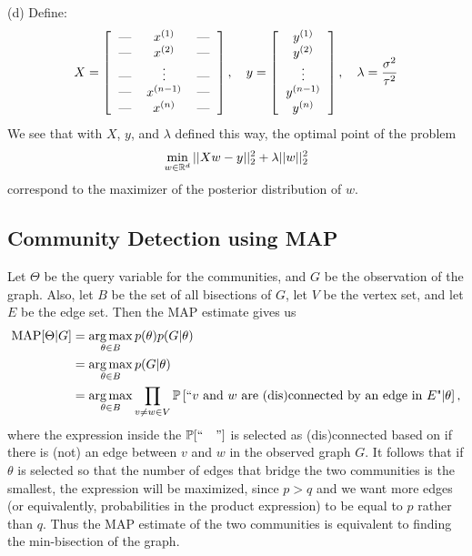 (d) Define:
\[
X = \left[\begin{tabular}{ccc}
--- & $x^{(1)}$ & ---\\
--- & $x^{(2)}$ & ---  \\
--- & $\vdots$ & --- \\
--- & $x^{(n - 1)}$ & --- \\
--- & $x^{(n)}$ & ---
\end{tabular}\right], \quad
y = \left[\begin{tabular}{c}
$y^{(1)}$ \\
$y^{(2)}$ \\
$\vdots$ \\
$y^{(n - 1)}$ \\
$y^{(n)}$
\end{tabular}\right], \quad
\lambda = \frac{\sigma^2}{\tau^2}
\]
We see that with $X$, $y$, and $\lambda$ defined this way, the optimal point of the problem
\[
\min_{w \in \R^d} ||Xw - y||_2^2 + \lambda||w||_2^2
\]
correspond to the maximizer of the posterior distribution of $w$.


\subsection{Community Detection using MAP}
Let $\Theta$ be the query variable for the communities, and $G$ be the observation of the graph. Also, let $B$ be the set of all bisections of $G$, let $V$ be the vertex set, and let $E$ be the edge set. Then the MAP estimate gives us
\begin{align*}
\MAP[\Theta | G] &= \argmax_{\theta \in B}p(\theta)p(G | \theta) \\
    &= \argmax_{\theta \in B}p(G|\theta) \\
    &= \argmax_{\theta \in B}\prod_{v\neq w \in V}\P\left[\text{``$v$ and $w$ are (dis)connected by an edge in $E$"} | \theta\right],
\end{align*}
where the expression inside the $\P[``\quad"]$ is selected as (dis)connected based on if there is (not) an edge between $v$ and $w$ in the observed graph $G$. It follows that if $\theta$ is selected so that the number of edges that bridge the two communities is the smallest, the expression will be maximized, since $p > q$ and we want more edges (or equivalently, probabilities in the product expression) to be equal to $p$ rather than $q$. Thus the MAP estimate of the two communities is equivalent to finding the min-bisection of the graph.